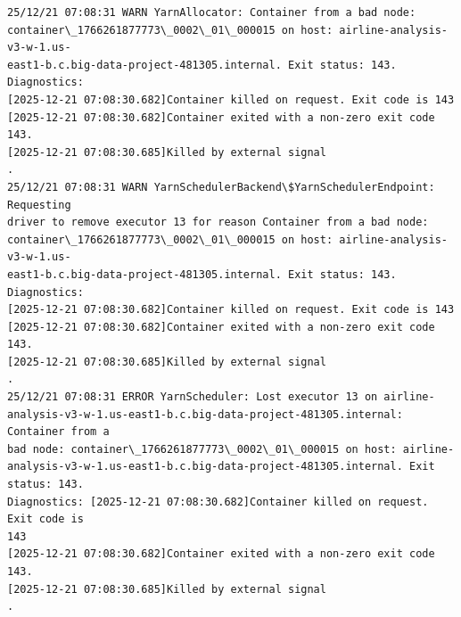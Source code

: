 \documentclass[11pt]{article}
\begin{document}
    \begin{Verbatim}[commandchars=\\\{\}]
25/12/21 07:08:31 WARN YarnAllocator: Container from a bad node:
container\_1766261877773\_0002\_01\_000015 on host: airline-analysis-v3-w-1.us-
east1-b.c.big-data-project-481305.internal. Exit status: 143. Diagnostics:
[2025-12-21 07:08:30.682]Container killed on request. Exit code is 143
[2025-12-21 07:08:30.682]Container exited with a non-zero exit code 143.
[2025-12-21 07:08:30.685]Killed by external signal
.
25/12/21 07:08:31 WARN YarnSchedulerBackend\$YarnSchedulerEndpoint: Requesting
driver to remove executor 13 for reason Container from a bad node:
container\_1766261877773\_0002\_01\_000015 on host: airline-analysis-v3-w-1.us-
east1-b.c.big-data-project-481305.internal. Exit status: 143. Diagnostics:
[2025-12-21 07:08:30.682]Container killed on request. Exit code is 143
[2025-12-21 07:08:30.682]Container exited with a non-zero exit code 143.
[2025-12-21 07:08:30.685]Killed by external signal
.
25/12/21 07:08:31 ERROR YarnScheduler: Lost executor 13 on airline-
analysis-v3-w-1.us-east1-b.c.big-data-project-481305.internal: Container from a
bad node: container\_1766261877773\_0002\_01\_000015 on host: airline-
analysis-v3-w-1.us-east1-b.c.big-data-project-481305.internal. Exit status: 143.
Diagnostics: [2025-12-21 07:08:30.682]Container killed on request. Exit code is
143
[2025-12-21 07:08:30.682]Container exited with a non-zero exit code 143.
[2025-12-21 07:08:30.685]Killed by external signal
.
    \end{Verbatim}
\end{document}
